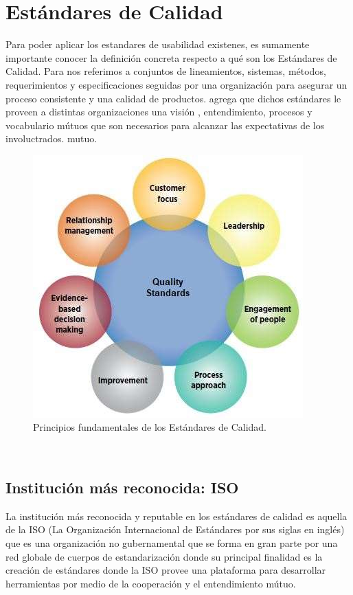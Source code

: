 \section{Estándares de Calidad}
Para poder aplicar los estandares de usabilidad existenes, es sumamente importante conocer la
definición concreta respecto a qué son los Estándares de Calidad. Para %
nos referimos a conjuntos de lineamientos, sistemas, métodos, requerimientos y especificaciones
seguidas por una organización para asegurar un proceso consistente y una calidad de productos.
agrega que dichos estándares le proveen a distintas organizaciones una visión , entendimiento,
procesos y vocabulario mútuos que son necesarios para alcanzar las expectativas de los involuctrados.
mutuo.
\begin{figure}[t]
    \centering
    \includegraphics[scale=0.4]{../images/fig1.JPG}
    \caption{Principios fundamentales de los Estándares de Calidad.}
    \label{fig:fig1}    
\end{figure}
\\

\subsection{Institución más reconocida: ISO}
La institución más reconocida y reputable en los estándares de calidad es aquella de la ISO
(La Organización Internacional de Estándares por sus siglas en inglés) que es una organización
no gubernamental que se forma en gran parte por una red globale de cuerpos de estandarización
donde su principal finalidad es la creación de estándares donde la ISO provee una plataforma
para desarrollar herramientas por medio de la cooperación y el entendimiento mútuo. %
\\

